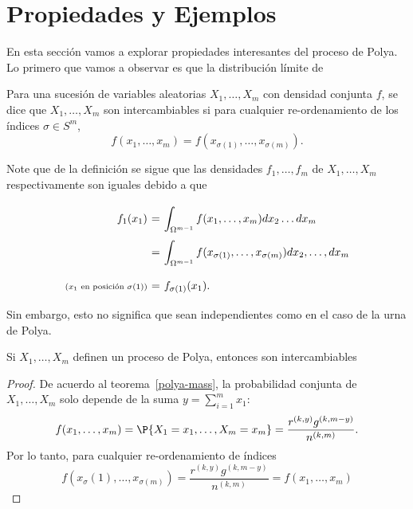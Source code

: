 \section{Propiedades y Ejemplos}

En esta sección vamos a explorar propiedades interesantes del proceso de Polya. Lo primero que vamos a observar es que la distribución límite de

\begin{definition}\label{variable}
    Para una sucesión de variables aleatorias $X_1,\ldots, X_m$ con densidad conjunta $f$, se dice que $X_1,\ldots, X_m$ son intercambiables si para cualquier re-ordenamiento de los índices $\sigma \in S^m$,
    \[ f(x_1,\ldots,x_m) = f(x_{\sigma(1)},\ldots,x_{\sigma(m)}). \]
\end{definition}

\begin{remark}
    Note que de la definición se sigue que las densidades $f_1,\ldots,f_m$ de $X_1,\ldots,X_m$ respectivamente son iguales debido a que
    \[ \everymath{\displaystyle}
    \arraycolsep=1.8pt\def\arraystretch{2.5}
    \begin{array}{rcl}
        f_1(x_1) & = & \int_{\Omega^{m-1}} f(x_1,\ldots,x_m) dx_2 \ldots dx_m\\
        & = & \int_{\Omega^{m-1}} f(x_{\sigma(1)},\ldots,x_{\sigma(m)}) dx_{2},\ldots,dx_{m}\\
       \scriptstyle{( x_{1} \text{ en posición } \sigma(1) )} & = & f_{\sigma(1)}(x_1).
    \end{array}\]
    Sin embargo, esto no significa que sean independientes como en el caso de la urna de Polya.
\end{remark}

\begin{theorem}
    Si $X_1,\ldots, X_m$ definen un proceso de Polya, entonces son intercambiables
\end{theorem}
\begin{proof}
    De acuerdo al teorema~\ref{polya-mass}, la probabilidad conjunta de $X_1,\ldots,X_m$ solo depende de la suma $y = \sum_{i=1}^m x_1$:
    \[ f(x_1,\ldots,x_m) = \P\{X_1 = x_1,\ldots, X_m = x_m\} = \frac{r^{(k,y)} g^{(k,m-y)}}{n^{(k,m)}}. \]
    Por lo tanto, para cualquier re-ordenamiento de índices
    \[ f(x_\sigma(1),\ldots,x_{\sigma(m)}) = \frac{r^{(k,y)} g^{(k,m-y)}}{n^{(k,m)}} = f(x_1,\ldots,x_m)\]
\end{proof}


